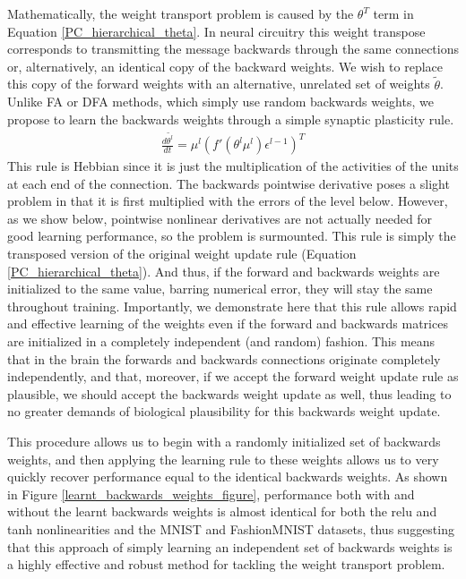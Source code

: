 Mathematically, the weight transport problem is caused by the $\theta^T$ term in Equation \ref{PC_hierarchical_theta}. In neural circuitry this weight transpose corresponds to transmitting the message backwards through the same connections or, alternatively, an identical copy of the backward weights. We wish to replace this copy of the forward weights with an alternative, unrelated set of weights $\tilde{\theta}$. Unlike FA or DFA methods, which simply use random backwards weights, we propose to learn the backwards weights through a simple synaptic plasticity rule. 
\begin{align*}
    \frac{d\tilde{\theta^l}}{dt} = \mu^l (f'(\theta^l \mu^l) \epsilon^{l-1})^T
\end{align*}
This rule is Hebbian since it is just the multiplication of the activities of the units at each end of the connection. The backwards pointwise derivative poses a slight problem in that it is first multiplied with the errors of the level below. However, as we show below, pointwise nonlinear derivatives are not actually needed for good learning performance, so the problem is surmounted. This rule is simply the transposed version of the original weight update rule (Equation \ref{PC_hierarchical_theta}). And thus, if the forward and backwards weights are initialized to the same value, barring numerical error, they will stay the same throughout training. Importantly, we demonstrate here that this rule allows rapid and effective learning of the weights even if the forward and backwards matrices are initialized in a completely independent (and random) fashion. This means that in the brain the forwards and backwards connections originate completely independently, and that, moreover, if we accept the forward weight update rule as plausible, we should accept the backwards weight update as well, thus leading to no greater demands of biological plausibility for this backwards weight update.

This procedure allows us to begin with a randomly initialized set of backwards weights, and then applying the learning rule to these weights allows us to very quickly recover performance equal to the identical backwards weights. As shown in Figure \ref{learnt_backwards_weights_figure}, performance both with and without the learnt backwards weights is almost identical for both the relu and tanh nonlinearities and the MNIST and FashionMNIST datasets, thus suggesting that this approach of simply learning an independent set of backwards weights is a highly effective and robust method for tackling the weight transport problem.

